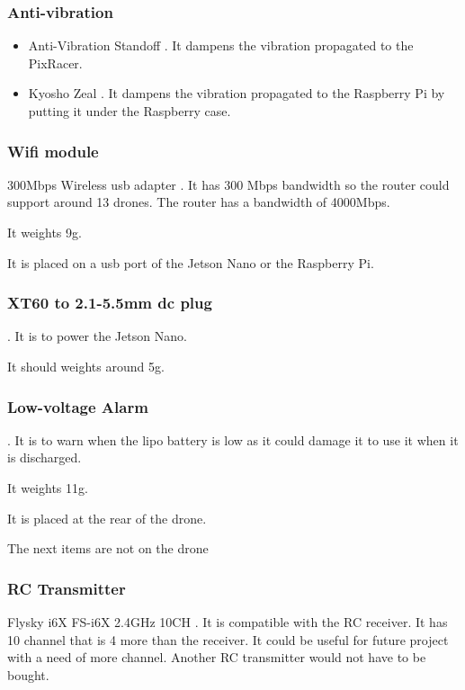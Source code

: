 \subsubsection{Anti-vibration}
\begin{itemize}
    \item Anti-Vibration Standoff \cite{bangood_standoff}. It dampens the vibration propagated to the PixRacer.

    \item Kyosho Zeal \cite{amazon_kyosho}. It dampens the vibration propagated to the Raspberry Pi by putting it under the Raspberry case.
\end{itemize}

\subsubsection{Wifi module}
300Mbps Wireless usb adapter \cite{amazon_panda_wifi_module}. It has 300 Mbps bandwidth so the router could support around 13 drones. The router has a bandwidth of 4000Mbps.

It weights 9g.

It is placed on a usb port of the Jetson Nano or the Raspberry Pi.

\subsubsection{XT60 to 2.1-5.5mm dc plug}
\cite{bangood_xt60_connector}. It is to power the Jetson Nano.

It should weights around 5g.

\subsubsection{Low-voltage Alarm}
\cite{bangood_battery_monitor}. It is to warn when the lipo battery is low as it could damage it to use it when it is discharged.

It weights 11g.

It is placed at the rear of the drone.

{\color{blue}The next items are not on the drone}

\subsubsection{RC Transmitter}
Flysky i6X FS-i6X 2.4GHz 10CH \cite{bangood_transmitter}. It is compatible with the RC receiver. It has 10 channel that is 4 more than the receiver. It could be useful for future project with a need of more channel. Another RC transmitter would not have to be bought.

